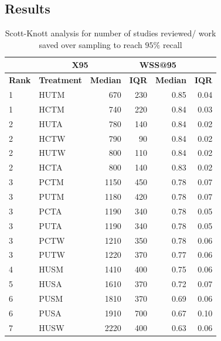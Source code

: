 \documentclass{svjour3}
\theoremstyle{break}
\begin{document}
\subsection{Results}
\label{subsect: Results}


\begin{table}
\caption{Scott-Knott analysis for number of studies reviewed/ work saved over sampling to reach $95\%$ recall}
\label{tab: scottknott}


\begin{center}
\parbox{.49\linewidth}{
\centering
{\scriptsize \begin{tabular}{l@{~~~}l@{~~~}r@{~~~}r@{~~~}r@{~~~}r}
\arrayrulecolor{lightgray}
\multicolumn{2}{l}{\textbf{Wahono}}  & \multicolumn{2}{c}{\textbf{X95}} & \multicolumn{2}{c}{\textbf{WSS@95}}\\\hline
\textbf{Rank} & \textbf{Treatment} & \textbf{Median} & \textbf{IQR} & \textbf{Median} & \textbf{IQR} \\\hline
\rowcolor{green!40}
  1 &         HUTM &    670  &  230 & 0.85 & 0.04 \\
  1 &         HCTM &    740  &  220 & 0.84 & 0.03 \\
\hline  2 &         HUTA &    780  &  140 & 0.84 & 0.02 \\
  2 &         HCTW &    790  &  90 & 0.84 & 0.02 \\
  2 &         HUTW &    800  &  110 & 0.84 & 0.02 \\
  2 &         HCTA &    800  &  140 & 0.83 & 0.02 \\
\hline  3 &         PCTM &    1150  &  450 & 0.78 & 0.07  \\
  3 &         PUTM &    1180  &  420 & 0.78 & 0.07 \\
  3 &         PCTA &    1190  &  340 & 0.78 & 0.05 \\
  3 &         PUTA &    1190  &  340 & 0.78 & 0.05 \\
\rowcolor{red!30}
  3 &         PCTW &    1210  &  350 &  0.78 & 0.06 \\
  3 &         PUTW &    1220  &  370 &  0.77 & 0.06 \\
\hline  4 &         HUSM &    1410  &  400 & 0.75 & 0.06 \\
\hline  5 &         HUSA &    1610  &  370 & 0.72 & 0.07 \\
\hline  6 &         PUSM &    1810  &  370 & 0.69 & 0.06 \\
\rowcolor{red!30}
  6 &         PUSA &    1910  &  700 & 0.67 & 0.10 \\
\hline  7 &         HUSW &    2220  &  400 & 0.63 & 0.06 \\

\end{tabular}}}
\end{center}
\end{table}
\end{document}
